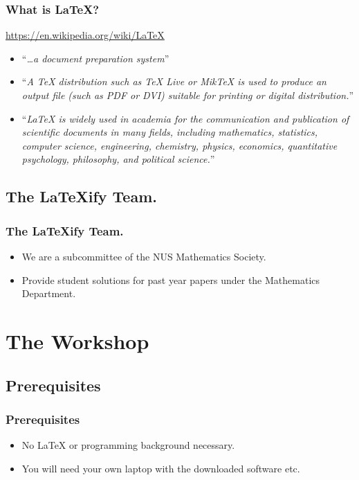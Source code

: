 \documentclass{beamer}
\begin{document}
    \begin{frame}
        \frametitle{What is \LaTeX{}?}
        \begin{center}
            \url{https://en.wikipedia.org/wiki/LaTeX}
        \end{center}
        \begin{itemize}
            \item ``\emph{\dots a document preparation system}''
            \item ``\emph{A TeX distribution such as TeX Live or MikTeX is used to produce an output file (such as PDF or DVI) suitable for printing or digital distribution.}''
            \item ``\emph{LaTeX is widely used in academia for the communication and publication of scientific documents in many fields, including mathematics, statistics, computer science, engineering, chemistry, physics, economics, quantitative psychology, philosophy, and political science.}''
        \end{itemize}
    \end{frame}

    \subsection{The \LaTeX ify Team.}
    \begin{frame}
        \frametitle{The \LaTeX ify Team.}
        \begin{itemize}
            \item We are a subcommittee of the NUS Mathematics Society.
            \item Provide student solutions for past year papers under the Mathematics Department.
        \end{itemize}
    \end{frame}

    \section{The Workshop}
    \subsection{Prerequisites}
    \begin{frame}
        \frametitle{Prerequisites}
        \begin{itemize}
            \item No \LaTeX{} or programming background necessary.
            \item You will need your own laptop with the downloaded software etc.
        \end{itemize}
    \end{frame}
\end{document}

